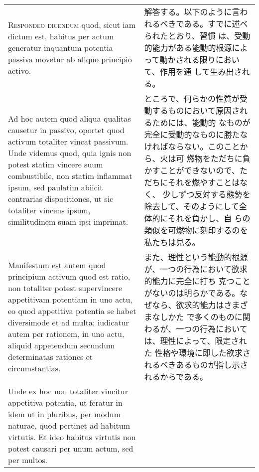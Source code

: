 \documentclass[10pt]{jsarticle} %
\begin{document}
\begin{longtable}{p{21em}p{21em}}
\\



{\scshape Respondeo dicendum} quod, sicut iam dictum est, habitus per
actum generatur inquantum potentia passiva movetur ab aliquo principio
activo.

&

解答する。以下のように言われるべきである。すでに述べられたとおり、習慣
は、受動的能力がある能動的根源によって動かされる限りにおいて、作用を通
して生み出される。

\\


Ad hoc autem quod aliqua qualitas causetur in passivo, oportet quod
activum totaliter vincat passivum. Unde videmus quod, quia ignis non
potest statim vincere suum combustibile, non statim inflammat ipsum,
sed paulatim abiicit contrarias dispositiones, ut sic totaliter
vincens ipsum, similitudinem suam ipsi imprimat.


&

ところで、何らかの性質が受動するものにおいて原因されるためには、能動的
なものが完全に受動的なものに勝たなければならない。このことから、火は可
燃物をただちに負かすことができないので、ただちにそれを燃やすことはなく、
少しずつ反対する態勢を除去して、そのようにして全体的にそれを負かし、自
らの類似を可燃物に刻印するのを私たちは見る。

\\

Manifestum est autem quod principium activum quod est ratio, non
totaliter potest supervincere appetitivam potentiam in uno actu, eo
quod appetitiva potentia se habet diversimode et ad multa; iudicatur
autem per rationem, in uno actu, aliquid appetendum secundum
determinatas rationes et circumstantias.


&

また、理性という能動的根源が、一つの行為において欲求的能力に完全に打ち
克つことがないのは明らかである。なぜなら、欲求的能力はさまざまなしかた
で多くのものに関わるが、一つの行為においては、理性によって、限定された
性格や環境に即した欲求されるべきあるものが指し示されるからである。

\\

Unde ex hoc non totaliter vincitur appetitiva potentia, ut feratur in
idem ut in pluribus, per modum naturae, quod pertinet ad habitum
virtutis. Et ideo habitus virtutis non potest causari per unum actum,
sed per multos.

&


\end{longtable}
\end{document}
